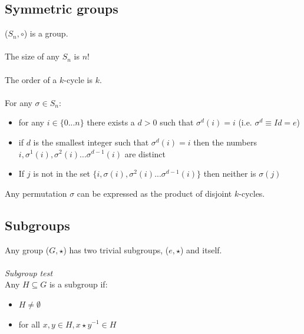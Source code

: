 \documentclass{scrartcl}
\begin{document}
\subsection{Symmetric groups}
($ S_{n}, \circ $) is a group.
\\\\
The size of any $ S_{n} $ is $ n! $
\\\\
The order of a $ k $-cycle  is $ k $.
\\\\
For any $ \sigma \in S_{n} $:
\begin{itemize}
\item for any $ i \in \{0...n\} $ there exists a $ d  > 0 $ such that $ \sigma^{d}(i) = i $ (i.e. $ \sigma^{d} \equiv Id = e $)
\item if $ d $ is the smallest integer such that $ \sigma^{d}(i) = i $ then the numbers $ i, \sigma^{1}(i), \sigma^{2}(i) ... \sigma^{d - 1}(i) $ are distinct
\item If $ j $ is not in the set $ \{i, \sigma(i), \sigma^{2}(i)...\sigma^{d - 1}(i)\} $ then neither is $ \sigma(j) $
\end{itemize}
Any permutation $ \sigma $ can be expressed as the product of disjoint $ k $-cycles.

\subsection{Subgroups}
Any group ($ G, \star $) has two trivial subgroups, ($ e, \star $) and itself.
\\\\
\textit{Subgroup test}
\\
Any $ H \subseteq G $ is a subgroup if:
\begin{itemize}
\item $ H \neq \emptyset $
\item for all $ x, y \in H, x \star y^{-1} \in H $
\end{itemize}
\end{document}
